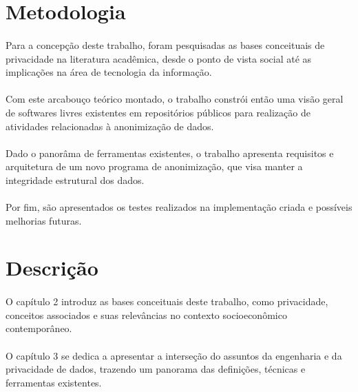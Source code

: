 \section{Metodologia}

\paragraph{} Para a concepção deste trabalho, foram pesquisadas as bases conceituais de privacidade na literatura acadêmica, desde o ponto de vista social até as implicações na área de tecnologia da informação.

\paragraph{} Com este arcabouço teórico montado, o trabalho constrói então uma visão geral de softwares livres existentes em repositórios públicos para realização de atividades relacionadas à anonimização de dados.

\paragraph{} Dado o panorâma de ferramentas existentes, o trabalho apresenta requisitos e arquitetura de um novo programa de anonimização, que visa manter a integridade estrutural dos dados.

\paragraph{} Por fim, são apresentados os testes realizados na implementação criada e possíveis melhorias futuras.


\section{Descrição}

\paragraph{}O capítulo 2 introduz as bases conceituais deste trabalho, como privacidade, conceitos associados e suas relevâncias no contexto socioeconômico contemporâneo.

\paragraph{}O capítulo 3 se dedica a apresentar a interseção do assuntos da engenharia e da privacidade de dados, trazendo um panorama das definições, técnicas e ferramentas existentes.

